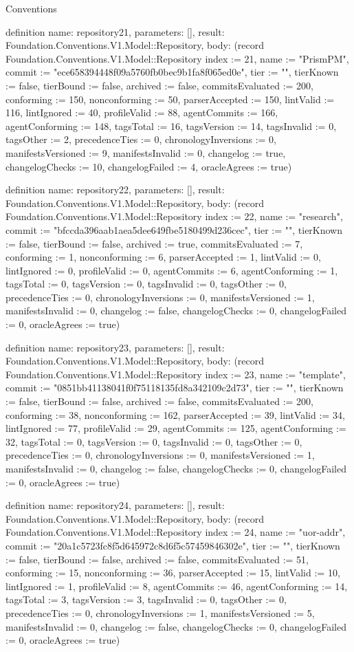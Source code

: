 \begin{lexlean}{Conventions}
\begin{semanticmodule}
definition{
  name: repository21,
  parameters: [],
  result: Foundation.Conventions.V1.Model::Repository,
  body: (record Foundation.Conventions.V1.Model::Repository {index := 21, name := "PrismPM", commit := "ece658394448f09a5760fb0bec9b1fa8f065ed0e", tier := "", tierKnown := false, tierBound := false, archived := false, commitsEvaluated := 200, conforming := 150, nonconforming := 50, parserAccepted := 150, lintValid := 116, lintIgnored := 40, profileValid := 88, agentCommits := 166, agentConforming := 148, tagsTotal := 16, tagsVersion := 14, tagsInvalid := 0, tagsOther := 2, precedenceTies := 0, chronologyInversions := 0, manifestsVersioned := 9, manifestsInvalid := 0, changelog := true, changelogChecks := 10, changelogFailed := 4, oracleAgrees := true})
}

definition{
  name: repository22,
  parameters: [],
  result: Foundation.Conventions.V1.Model::Repository,
  body: (record Foundation.Conventions.V1.Model::Repository {index := 22, name := "research", commit := "bfccda396aab1aea5dee649fbe5180499d236cec", tier := "", tierKnown := false, tierBound := false, archived := true, commitsEvaluated := 7, conforming := 1, nonconforming := 6, parserAccepted := 1, lintValid := 0, lintIgnored := 0, profileValid := 0, agentCommits := 6, agentConforming := 1, tagsTotal := 0, tagsVersion := 0, tagsInvalid := 0, tagsOther := 0, precedenceTies := 0, chronologyInversions := 0, manifestsVersioned := 1, manifestsInvalid := 0, changelog := false, changelogChecks := 0, changelogFailed := 0, oracleAgrees := true})
}

definition{
  name: repository23,
  parameters: [],
  result: Foundation.Conventions.V1.Model::Repository,
  body: (record Foundation.Conventions.V1.Model::Repository {index := 23, name := "template", commit := "0851bb41138041f0f75118135fd8a342109c2d73", tier := "", tierKnown := false, tierBound := false, archived := false, commitsEvaluated := 200, conforming := 38, nonconforming := 162, parserAccepted := 39, lintValid := 34, lintIgnored := 77, profileValid := 29, agentCommits := 125, agentConforming := 32, tagsTotal := 0, tagsVersion := 0, tagsInvalid := 0, tagsOther := 0, precedenceTies := 0, chronologyInversions := 0, manifestsVersioned := 1, manifestsInvalid := 0, changelog := false, changelogChecks := 0, changelogFailed := 0, oracleAgrees := true})
}

definition{
  name: repository24,
  parameters: [],
  result: Foundation.Conventions.V1.Model::Repository,
  body: (record Foundation.Conventions.V1.Model::Repository {index := 24, name := "uor-addr", commit := "20a1c5723fc8f5d645972c8d6f5c57459846302e", tier := "", tierKnown := false, tierBound := false, archived := false, commitsEvaluated := 51, conforming := 15, nonconforming := 36, parserAccepted := 15, lintValid := 10, lintIgnored := 1, profileValid := 8, agentCommits := 46, agentConforming := 14, tagsTotal := 3, tagsVersion := 3, tagsInvalid := 0, tagsOther := 0, precedenceTies := 0, chronologyInversions := 1, manifestsVersioned := 5, manifestsInvalid := 0, changelog := false, changelogChecks := 0, changelogFailed := 0, oracleAgrees := true})
}


\end{semanticmodule}
\end{lexlean}
